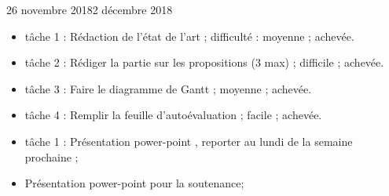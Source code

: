 \documentclass[12pt]{fiche-rd-info}
\begin{document}

\begin{fichesuivi}{26 novembre 2018}{2 décembre 2018}

	\begin{travaileffectue}
		\begin{itemize}
			\item tâche 1 : Rédaction de l'état de l'art ; difficulté : moyenne ; achevée.
			\item tâche 2 : Rédiger la partie sur les propositions (3 max) ; difficile ; achevée.
			\item tâche 3 : Faire le diagramme de Gantt ; moyenne ; achevée.
			\item tâche 4 : Remplir la feuille d'autoévaluation ; facile ; achevée.
		\end{itemize}
	\end{travaileffectue}

	\begin{travailnoneffectue}
		\begin{itemize}
				\item tâche 1 : Présentation power-point , reporter au lundi de la semaine prochaine ;
		\end{itemize}
	\end{travailnoneffectue}


	\begin{planification}
		\begin{itemize}
			\item Présentation power-point pour la soutenance;
		\end{itemize}
	\end{planification}
\end{fichesuivi}
\end{document}
